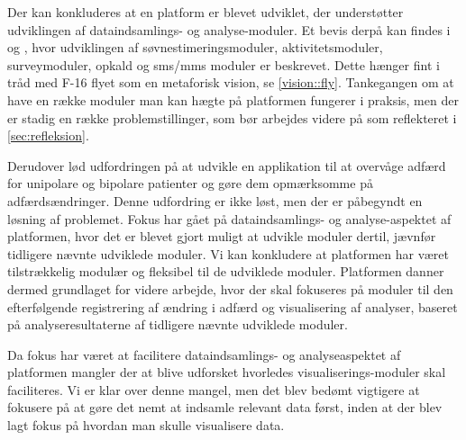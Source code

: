 Der kan konkluderes at en platform er blevet udviklet, der understøtter udviklingen af dataindsamlings- og analyse-moduler.
Et bevis derpå kan findes i \citet{misc:soevnrapp} og \citet{misc:surveyrapp}, hvor udviklingen af søvnestimeringsmoduler, aktivitetsmoduler, surveymoduler, opkald og sms/mms moduler er beskrevet.
Dette hænger fint i tråd med F-16 flyet som en metaforisk vision, se \cref{vision::fly}.
Tankegangen om at have en række moduler man kan hægte på platformen fungerer i praksis, men der er stadig en række problemstillinger, som bør arbejdes videre på som reflekteret i \cref{sec:refleksion}.

Derudover lød udfordringen på at udvikle en applikation til at overvåge adfærd for unipolare og bipolare patienter og gøre dem opmærksomme på adfærdsændringer.
Denne udfordring er ikke løst, men der er påbegyndt en løsning af problemet.
Fokus har gået på dataindsamlings- og analyse-aspektet af platformen, hvor det er blevet gjort muligt at udvikle moduler dertil, jævnfør tidligere nævnte udviklede moduler.
Vi kan konkludere at platformen har været tilstrækkelig modulær og fleksibel til de udviklede moduler.
Platformen danner dermed grundlaget for videre arbejde, hvor der skal fokuseres på moduler til den efterfølgende registrering af ændring i adfærd og visualisering af analyser, baseret på analyseresultaterne af tidligere nævnte udviklede moduler.

Da fokus har været at facilitere dataindsamlings- og analyseaspektet af platformen mangler der at blive udforsket hvorledes visualiserings-moduler skal faciliteres.
Vi er klar over denne mangel, men det blev bedømt vigtigere at fokusere på at gøre det nemt at indsamle relevant data først, inden at der blev lagt fokus på hvordan man skulle visualisere data.

